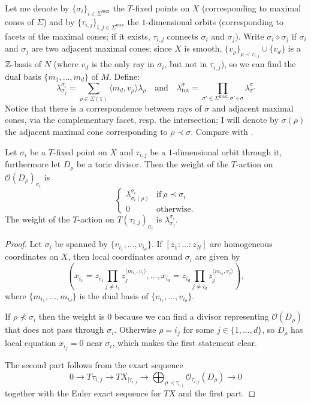 Let me denote by $\{\sigma_i\}_{i\in\Sigma^\text{max}}$ the $T$-fixed points on $X$ (corresponding to maximal cones of $\Sigma$) and by $\{\tau_{i,j}\}_{i,j\in\Sigma^\text{max}}$ the $1$-dimensional orbits (corresponding to facets of the maximal cones; if it exists, $\tau_{i,j}$ connects $\sigma_i$ and $\sigma_j$).
Write $\sigma_i\diamond\sigma_j$ if $\sigma_i$ and $\sigma_j$ are two adjacent maximal cones; since $X$ is smooth, $\{v_\rho\}_{\rho\prec\tau_{i,j}}\cup\{v_d\}$ is a $\mathbb{Z}$-basis of $N$ (where $v_d$ is the only ray in $\sigma_i$, but not in $\tau_{i,j}$), so we can find the dual basis $\{m_1,\ldots,m_d\}$ of $M$. Define: \[\lambda^{\sigma_i}_{\sigma_j}=\sum_{\rho\in\Sigma(1)}\langle m_d,v_\rho\rangle\lambda_\rho \quad \text{and} \quad \lambda^{\sigma}_{\text{tot}}=\prod_{\sigma'\in\Sigma^{\text{max}}\colon\sigma'\diamond\sigma}\lambda^\sigma_{\sigma'}\] Notice that there is a correspondence between rays of $\sigma$ and adjacent maximal cones, via the complementary facet, resp. the intersection; I will denote by $\sigma(\rho)$ the adjacent maximal cone corresponding to $\rho\prec\sigma$. Compare with \cite[\S\S 6.4 and 7.3]{HolgerSpielberg}.

\begin{lem}\label{lem:weights}
 Let $\sigma_i$ be a $T$-fixed point on $X$ and $\tau_{i,j}$ be a $1$-dimensional orbit through it, furthermore let $D_\rho$ be a toric divisor. Then the weight of the $T$-action on $\mathcal O(D_\rho)_{\sigma_i}$ is
 \[
  \begin{cases}
      \lambda^{\sigma_i}_{\sigma_i(\rho)} & \text{if}\ \rho\prec \sigma_i \\
      0 & \text{otherwise.}
    \end{cases}
 \]
The weight of the $T$-action on $T(\tau_{i,j})_{\sigma_i}$ is $\lambda^{\sigma_i}_{\sigma_j}$.
\end{lem}
\begin{proof}
 Let $\sigma_i$ be spanned by $\{v_{i_1},\ldots,v_{i_d}\}$. If $[z_1:\ldots:z_N]$ are homogeneous coordinates on $X$, then local coordinates around $\sigma_i$ are given by \[\left(x_{i_1}=z_{i_1}\prod_{j\neq i_1}z_j^{\langle m_{i_1},v_j\rangle},\ldots,x_{i_d}=z_{i_d}\prod_{j\neq i_d}z_j^{\langle m_{i_d},v_j\rangle}\right),\] where $\{m_{i_1},\ldots,m_{i_d}\}$ is the dual basis of $\{v_{i_1},\ldots,v_{i_d}\}$.
 
 If $\rho\nprec \sigma_i$ then the weight is $0$ because we can find a divisor representing $\mathcal O(D_\rho)$ that does not pass through $\sigma_i$. Otherwise $\rho=i_j$ for some $j\in\{1,\ldots,d\}$, so $D_{\rho}$ has local equation $x_{i_j}=0$ near $\sigma_i$, which makes the first statement clear.
 
 The second part follows from the exact sequence
 \[
  0\to T\tau_{i,j}\to TX_{|\tau_{i,j}}\to \bigoplus_{\rho\prec\tau_{i,j}}\mathcal O_{\tau_{i,j}}(D_{\rho})\to 0
 \]
together with the Euler exact sequence for $TX$ and the first part.
\end{proof}

